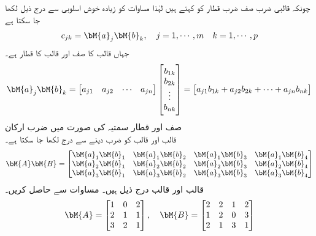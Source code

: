 چونکہ قالبی ضرب صف ضرب قطار کو کہتے ہیں لہٰذا مساوات  کو زیادہ خوش اسلوبی سے درج ذیل لکھا جا سکتا ہے
\begin{align}\label{مساوات_الجبرائی_قالبی_ضرب_ب}
c_{jk}=\bM{a}_j \bM{b}_k,\quad j=1,\cdots,m \quad k=1,\cdots,p
\end{align} 
جہاں  قالب  کا صف  اور  قالب  کا قطار  ہے۔ 
\begin{align*}
\bM{a}_j\bM{b}_k=
\begin{bmatrix}
a_{j1}& a_{j2}& \cdots & a_{jn}
\end{bmatrix}
\begin{bmatrix}
b_{1k}\\
b_{2k}\\
\vdots\\
b_{nk}
\end{bmatrix}=
\begin{bmatrix}
a_{j1}b_{1k}+a_{j2}b_{2k}+\cdots +a_{jn}b_{nk}
\end{bmatrix}
\end{align*}
\quad صف اور قطار سمتیہ کی صورت میں ضرب ارکان\\
 قالب  اور  قالب  کو ضرب دینے سے درج لکھا جا سکتا ہے۔
\begin{align}\label{مساوات_الجبرا_ضرب_تین_چار}
\bM{A} \bM{B}=
\begin{bmatrix}
\bM{a}_1\bM{b}_1 & \bM{a}_1\bM{b}_2 & \bM{a}_1\bM{b}_3 & \bM{a}_1\bM{b}_4 \\
\bM{a}_2\bM{b}_1 & \bM{a}_2\bM{b}_2 & \bM{a}_2\bM{b}_3 & \bM{a}_2\bM{b}_4 \\
\bM{a}_3\bM{b}_1 & \bM{a}_3\bM{b}_2 & \bM{a}_3\bM{b}_3 & \bM{a}_3\bM{b}_4 
\end{bmatrix}
\end{align}
 قالب  اور  قالب  درج ذیل ہیں۔ مساوات   سے  حاصل کریں۔
\begin{align*}
\bM{A}=
\begin{bmatrix}
1&0&2\\
2&1&1\\
3&2&1
\end{bmatrix},\quad
\bM{B}=
\begin{bmatrix}
2&2&1&2\\
1&2&0&3\\
2&1&3&1
\end{bmatrix}
\end{align*}
